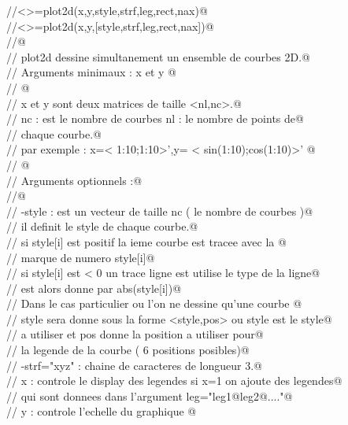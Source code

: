 
\verb@//<>=plot2d(x,y,style,strf,leg,rect,nax)@ \\
\verb@//<>=plot2d(x,y,[style,strf,leg,rect,nax])@ \\
\verb@//@ \\
\verb@// plot2d dessine simultanement un ensemble de courbes 2D.@ \\
\verb@// Arguments minimaux : x et y @ \\
\verb@// @ \\
\verb@// x et y sont deux matrices de taille <nl,nc>.@ \\
\verb@//   nc : est le nombre de courbes nl : le nombre de points de@ \\
\verb@//   chaque courbe.@ \\
\verb@// par exemple : x=< 1:10;1:10>',y= < sin(1:10);cos(1:10)>' @ \\
\verb@// @ \\
\verb@// Arguments optionnels :@ \\
\verb@//@ \\
\verb@//   -style : est un vecteur de taille nc ( le nombre de courbes )@ \\
\verb@//       il definit le style de chaque courbe.@ \\
\verb@//       si style[i] est positif la ieme courbe est tracee avec la @ \\
\verb@//           marque de numero style[i]@ \\
\verb@//       si style[i] est < 0 un trace ligne est utilise le type de la ligne@ \\
\verb@//           est alors donne par abs(style[i])@ \\
\verb@//       Dans le cas particulier ou l'on ne dessine qu'une courbe @ \\
\verb@//       style sera donne sous la forme <style,pos> ou style est le style@ \\
\verb@//         a utiliser et pos donne la position a utiliser pour@ \\
\verb@//         la legende de la courbe ( 6 positions posibles)@ \\
\verb@//   -strf="xyz" : chaine de caracteres de longueur 3.@ \\
\verb@//     x : controle le display des legendes si x=1 on ajoute des legendes@ \\
\verb@//        qui sont donnees dans l'argument leg="leg1@leg2@...."@ \\
\verb@//     y : controle l'echelle du graphique @ \\
